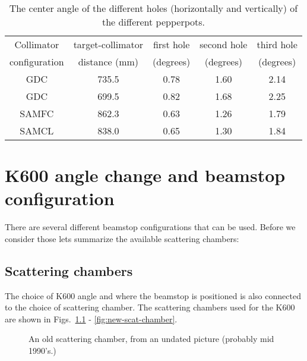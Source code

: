 \documentclass[11pt]{report}
\begin{document}
\begin{table}[!ht]
\centering
\begin{tabular}{c|c|c|c|c}
\hline
\hline
Collimator    & target-collimator & first hole & second hole & third hole\\
configuration & distance (mm)     & (degrees)  & (degrees)   & (degrees)\\
\hline
GDC	&	735.5 &		0.78 &	1.60 &		2.14 \\
GDC	&	699.5 &		0.82 &	1.68 &		2.25 \\
SAMFC	&	862.3 &		0.63 &	1.26 &		1.79 \\
SAMCL	&	838.0 &		0.65 &	1.30 &		1.84 \\
\hline
\hline
\end{tabular}
\caption{The center angle of the different holes (horizontally and vertically) of the different pepperpots.}
\label{table:pepperpots}
\end{table}

\clearpage



\chapter{K600 angle change and beamstop configuration}


There are several different beamstop configurations that can be used.
Before we consider those lets summarize the available scattering chambers:



\section{Scattering chambers}\label{sec:scatteringchambers}

The choice of K600 angle and where the beamstop is positioned is also connected to the choice of scattering
chamber.  The scattering chambers used for the K600 are shown in Figs.~\ref{fig:old-scat-chamber} - \ref{fig:new-scat-chamber}.

\begin{figure}[!ht]
\centerline{\vspace{0cm}\hspace{0cm}
}
\centering
\caption{An old scattering chamber, from an undated picture (probably mid 1990's.)}
\label{fig:old-scat-chamber}
\end{figure} 
\end{document}

